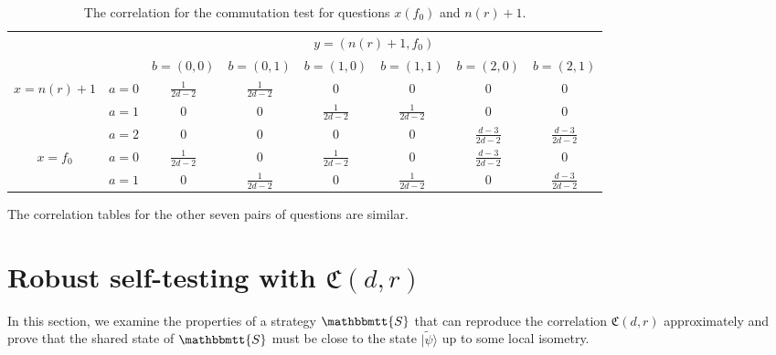 \documentclass[11pt,letterpaper]{article}
\newcommand{\ket}[1]{|#1\rangle}
\newcommand{\1}{\mathbb{1}}
\newcommand{\tpsi}{\tilde{\psi}}
\newcommand{\nr}{n(r)}
\newcommand{\fC}{\mathfrak{C}}
\newcommand{\bS}{\mathbbmtt{S}}
\theoremstyle{definition}
\begin{document}
\begin{table}[H]
\begin{center}
\begin{tabular}{|c|c||c|c|c|c|c|c|}
\hline
\multicolumn{2}{|c|}{} &
\multicolumn{6}{|c|}{$y=(\nr+1, f_0)$}\\
\cline{3-8}
\multicolumn{2}{|c|}{} &
$b = (0,0)$ & $b=(0,1)$ & 
$b = (1,0)$ & $b=(1,1)$ &
$b = (2,0)$ & $b=(2,1)$   \\
\hline
\hline
\multirow{3}{*}{$x = \nr+1$} & $a=0$ & $\frac{1}{2d-2}$ & $\frac{1}{2d-2}$ &  $0$
& $0$ & $0$ & $0$  \\
\cline{2-8}
&$a=1$ & $0$ & $0 $ & $\frac{1}{2d-2}$ 
&  $\frac{1}{2d-2}$ & $0$ & $0$  \\
\cline{2-8}
&$a=2$ & 0 & 0 & $0$ 
&  0 & $\frac{d-3}{2d-2}$ & $\frac{d-3}{2d-2} $  \\
\hline
\multirow{2}{*}{$x = f_0$} & $a=0$ & $\frac{1}{2d-2}$ & $0$ & $\frac{1}{2d-2}$ 
& $0$ & $\frac{d-3}{2d-2}$ & 0  \\
\cline{2-8}
&$a=1$ & $0$ & $\frac{1}{2d-2}$ & $0$ 
&  $\frac{1}{2d-2}$ & $0$ & $\frac{d-3}{2d-2}$  \\
\hline
\end{tabular}
\end{center}
\caption{The correlation for the commutation test for questions $x(f_0)$ and $\nr+1$.}
\label{tbl:comm}
\end{table}
The correlation tables for the other seven pairs
of questions are similar.

\section{Robust self-testing with $\fC(d,r)$}
\label{sec:main}
In this section, we examine the properties of a strategy $\bS$ that can reproduce the
correlation $\fC(d,r)$ approximately and 
prove that the shared state of $\bS$ must be close to the state $\ket{\tpsi}$
up to some local isometry.
\end{document}
